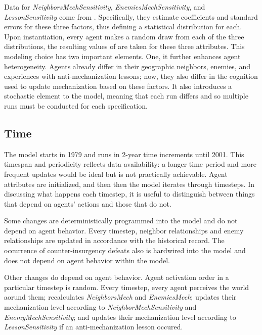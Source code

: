 \documentclass{article}
\begin{document}
Data for \textit{NeighborsMechSensitivity}, \textit{EnemiesMechSensitivity}, and
\textit{LessonSensitivity} come from \cite{sechser2010army}. Specifically, they
estimate coefficients and standard errors for these three factors, thus defining
a statistical distribution for each. Upon instantiation, every agent makes a
random draw from each of the three distributions, the resulting values of are
taken for these three attributes. This modeling choice has two important
elements. One, it further enhances agent heterogeneity. Agents already differ in
their geographic neighbors, enemies, and experiences with anti-mechanization
lessons; now, they also differ in the cognition used to update mechanization
based on these factors. It also introduces a stochastic element to the
model, meaning that each run differs and so multiple runs must be conducted for
each specification.

\subsection{Time}

The model starts in 1979 and runs in 2-year time increments until 2001. This
timespan and periodicity reflects data availability: a longer time period and
more frequent updates would be ideal but is not practically achievable. Agent
attributes are initialized, and then then the model iterates through timesteps. 
In discussing what happens each timestep, it is useful to distinguish between
things that depend on agents' actions and those that do not.

Some changes are deterministically programmed into the model and do not depend on
agent behavior. Every timestep, neighbor relationships and enemy relationships
are updated in accordance with the historical record. The occurrence of
counter-insurgency defeats also is hardwired into the model and does not depend
on agent behavior within the model.

Other changes do depend on agent behavior. Agent activation order in a
particular timestep is random. Every timestep, every agent perceives the world
aorund them; recalculates \textit{NeighborsMech} and \textit{EnemiesMech};
updates their mechanization level according to \textit{NeighborMechSensitivity}
and \textit{EnemyMechSensitivity}; and updates their mechanization level
according to \textit{LessonSensitivity} if an anti-mechanization lesson occured.
\end{document}
